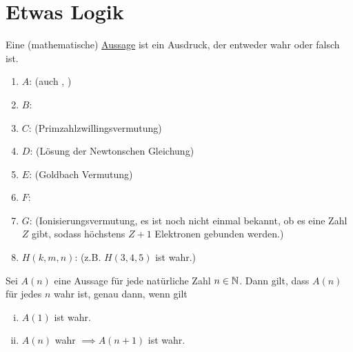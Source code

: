 \documentclass[../ana1.tex]{subfiles}
\begin{document}
\setcounter{section}{1}

\section{Etwas Logik}
\begin{defi*}
	Eine (mathematische) \underline{Aussage} ist ein Ausdruck, der entweder wahr oder falsch ist.
\end{defi*}

\begin{bspe}\leavevmode
	\begin{enumerate}[(1)]
		\item \(A \):   (auch , )
		\item \(B \): 
		\item \(C \):  (Primzahlzwillingsvermutung)
		\item \(D \):  (Lösung der Newtonschen Gleichung)
		\item \(E \):  (Goldbach Vermutung)
		\item \(F \): 
		\item \(G \):  (Ionisierungsvermutung, es ist noch nicht einmal bekannt, ob es eine Zahl \(Z \) gibt, sodass höchstens \(Z+1 \) Elektronen gebunden werden.)
		\item \(H(k,m,n) \):  (z.B. \(H(3,4,5) \) ist wahr.)
	\end{enumerate}
\end{bspe}

\begin{bem}
	Sei  \(A(n) \) eine Aussage für jede natürliche Zahl \(n\in \mathbb{N} \). Dann gilt, dass
	\(A(n) \) für jedes \(n \) wahr ist, genau dann, wenn gilt
	\begin{enumerate}[(i)]
		\item \(A(1) \) ist wahr.
		\item \(A(n) \) wahr \(\implies A(n+1) \) ist wahr.
	\end{enumerate}
\end{bem}
\end{document}

